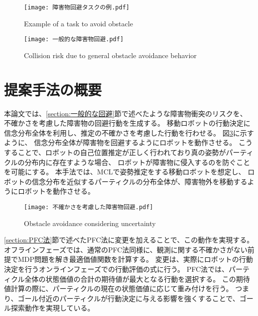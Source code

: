 \begin{figure}[H]
  \begin{center}
    \texttt{[image: 障害物回避タスクの例.pdf]}
    \caption{Example of a task to avoid obstacle}
    \label{fig:障害物回避タスクの例}
  \end{center}
\end{figure}

\begin{figure}[H]
  \begin{center}
    \texttt{[image: 一般的な障害物回避.pdf]}
    \caption{Collision risk due to general obstacle avoidance behavior}
    \label{fig:一般的な障害物回避}
  \end{center}
\end{figure}


\section{提案手法の概要} \label{section:method overview}
本論文では、\ref{section:一般的な回避}節で述べたような障害物衝突のリスクを、
不確かさを考慮した障害物の回避行動を生成する。
移動ロボットの行動決定に信念分布全体を利用し、推定の不確かさを考慮した行動を行わせる。
図\ref{fig:不確かさを考慮した障害物回避}に示すように、
信念分布全体が障害物を回避するようにロボットを動作させる。
こうすることで、ロボットの自己位置推定が正しく行われており真の姿勢がパーティクルの分布内に存在すような場合、
ロボットが障害物に侵入するのを防ぐことを可能にする。
本手法では、MCLで姿勢推定をする移動ロボットを想定し、
ロボットの信念分布を近似するパーティクルの分布全体が、障害物外を移動するようにロボットを動作させる。

\begin{figure}[H]
  \begin{center}
    \texttt{[image: 不確かさを考慮した障害物回避.pdf]}
    \caption{Obstacle avoidance considering uncertainty}
    \label{fig:不確かさを考慮した障害物回避}
  \end{center}
\end{figure}

\ref{section:PFC法}節で述べたPFC法に変更を加えることで、この動作を実現する。
オフラインフェーズでは、通常のPFC法同様に、観測に関する不確かさがない前提でMDP問題を解き最適価値関数を計算する。
変更は、実際にロボットの行動決定を行うオンラインフェーズでの行動評価の式に行う。
PFC法では、パーティクル全体の状態価値の合計の期待値が最大となる行動を選択する。
この期待値計算の際に、パーティクルの現在の状態価値に応じて重み付けを行う。
つまり、ゴール付近のパーティクルが行動決定に与える影響を強くすることで、ゴール探索動作を実現している。

